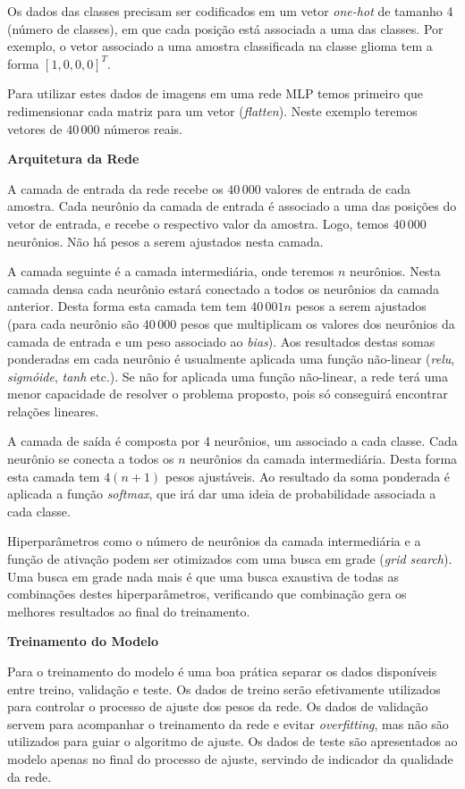 \documentclass[final,3p]{elsarticle}
\numberwithin{equation}{section}
\begin{document}
        Os dados das classes precisam ser codificados em um vetor \emph{one-hot} de tamanho 4 (número de classes), em que cada posição está associada a uma das classes. Por exemplo, o vetor associado a uma amostra classificada na classe glioma tem a forma $[1,0,0,0]^T$.

        Para utilizar estes dados de imagens em uma rede MLP temos primeiro que redimensionar cada matriz para um vetor (\emph{flatten}). Neste exemplo teremos vetores de $40\,000$ números reais.

        \noindent \textbf{Arquitetura da Rede}

        A camada de entrada da rede recebe os $40\,000$ valores de entrada de cada amostra. Cada neurônio da camada de entrada é associado a uma das posições do vetor de entrada, e recebe o respectivo valor da amostra. Logo, temos $40\,000$ neurônios. Não há pesos a serem ajustados nesta camada.

        A camada seguinte é a camada intermediária, onde teremos $n$ neurônios. Nesta camada densa cada neurônio estará conectado a todos os neurônios da camada anterior. Desta forma esta camada tem tem $40\,001n$ pesos a serem ajustados (para cada neurônio são $40\,000$ pesos que multiplicam os valores dos neurônios da camada de entrada e um peso associado ao \emph{bias}). Aos resultados destas somas ponderadas em cada neurônio é usualmente aplicada uma função não-linear (\emph{relu}, \emph{sigmóide}, \emph{tanh} etc.). Se não for aplicada uma função não-linear, a rede terá uma menor capacidade de resolver o problema proposto, pois só conseguirá encontrar relações lineares.

        A camada de saída é composta por 4 neurônios, um associado a cada classe. Cada neurônio se conecta a todos os $n$ neurônios da camada intermediária. Desta forma esta camada tem $4 (n+1)$ pesos ajustáveis. Ao resultado da soma ponderada é aplicada a função \emph{softmax}, que irá dar uma ideia de probabilidade associada a cada classe.

        Hiperparâmetros como o número de neurônios da camada intermediária e a função de ativação podem ser otimizados com uma busca em grade (\emph{grid search}). Uma busca em grade nada mais é que uma busca exaustiva de todas as combinações destes hiperparâmetros, verificando que combinação gera os melhores resultados ao final do treinamento.

        \noindent \textbf{Treinamento do Modelo}

        Para o treinamento do modelo é uma boa prática separar os dados disponíveis entre treino, validação e teste. Os dados de treino serão efetivamente utilizados para controlar o processo de ajuste dos pesos da rede. Os dados de validação servem para acompanhar o treinamento da rede e evitar \emph{overfitting}, mas não são utilizados para guiar o algoritmo de ajuste. Os dados de teste são apresentados ao modelo apenas no final do processo de ajuste, servindo de indicador da qualidade da rede.
\end{document}
